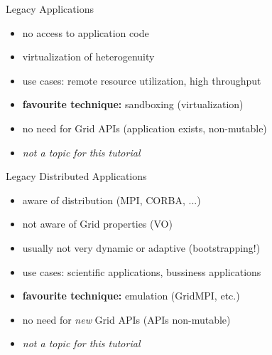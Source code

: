 \documentclass[%
  pdf,
  colorBG,
  slideColor,
  frames,
  ogf
]{prosper}
\newcommand{\I}[1]{\textit{#1}}
\newcommand{\B}[1]{\textbf{#1}}
\newcommand{\dn}{\vspace*{+1em}}
\begin{document}
 
 \begin{slide}{Legacy Applications}
 
  \dn
 
  \begin{itemize}
   \item no access to application code
   \item virtualization of heterogenuity
   \item use cases: remote resource utilization, high throughput
   \item \B{favourite technique:} sandboxing (virtualization)
   \item no need for Grid APIs (application exists, non-mutable)\\[2em]
   \item \I{not a topic for this tutorial}
  \end{itemize}
 
 \end{slide}
 
 
 \begin{slide}{Legacy Distributed Applications}
 
  \dn
 
  \begin{itemize}
   \item aware of distribution (MPI, CORBA, ...)
   \item not aware of Grid properties (VO)
   \item usually not very dynamic or adaptive (bootstrapping!)
   \item use cases: scientific applications, bussiness applications
   \item \B{favourite technique:} emulation (GridMPI, etc.)
   \item no need for \I{new} Grid APIs (APIs non-mutable)\\[2em]
   \item \I{not a topic for this tutorial}
  \end{itemize}
 
 \end{slide}
 
 
\end{document}
